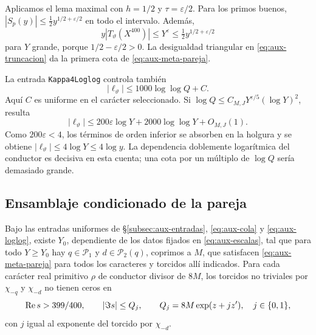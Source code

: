Aplicamos el lema maximal con $h=1/2$ y $\tau=\varepsilon/2$.
Para los primos buenos, $|S_p(y)|\le\tfrac12 y^{1/2+\varepsilon/2}$
en todo el intervalo. Además,
\[
 y|T_\vartheta(X^{400})|\le Y^\varepsilon
       \le\tfrac12 y^{1/2+\varepsilon/2}
\]
para $Y$ grande, porque $1/2-\varepsilon/2>0$.
La desigualdad triangular en \eqref{eq:aux-truncacion} da la primera
cota de \eqref{eq:aux-meta-pareja}.

La entrada \texttt{Kappa4Loglog} controla también
\begin{equation}
 |\ell_\vartheta|\le1000\log\log Q+C.
 \label{eq:aux-loglog}
\end{equation}
Aquí $C$ es uniforme en el carácter seleccionado. Si
$\log Q\le C_{M,J}Y^{\varepsilon/5}(\log Y)^2$, resulta
\[
 |\ell_\vartheta|\le200\varepsilon\log Y
                    +2000\log\log Y+O_{M,J}(1).
\]
Como $200\varepsilon<4$, los términos de orden inferior se absorben
en la holgura y se obtiene $|\ell_\vartheta|\le4\log Y\le4\log y$.
La dependencia doblemente logarítmica del conductor es decisiva en
esta cuenta; una cota por un múltiplo de $\log Q$ sería demasiado grande.

\subsection{Ensamblaje condicionado de la pareja}

\begin{proposicion}
\label{prop:aux-pareja}
Bajo las entradas uniformes de §\ref{subsec:aux-entradas},
\eqref{eq:aux-cola} y \eqref{eq:aux-loglog}, existe $Y_0$, dependiente
de los datos fijados en \eqref{eq:aux-escalas}, tal que para todo
$Y\ge Y_0$ hay $q\in\mathcal P_1$ y $d\in\mathcal P_2(q)$,
coprimos a $M$, que satisfacen \eqref{eq:aux-meta-pareja} para todos
los caracteres y torcidos allí indicados. Para cada carácter real
primitivo $\rho$ de conductor divisor de $8M$, los torcidos no triviales
por $\chi_{-q}$ y $\chi_{-d}$ no tienen ceros en
\begin{equation}
 \operatorname{Re} s>399/400,\qquad |\Im s|\le Q_j,
 \qquad Q_j=8M\exp(z+jz'),\quad j\in\{0,1\},
 \label{eq:aux-cajas}
\end{equation}
con $j$ igual al exponente del torcido por $\chi_{-d}$.
\end{proposicion}

